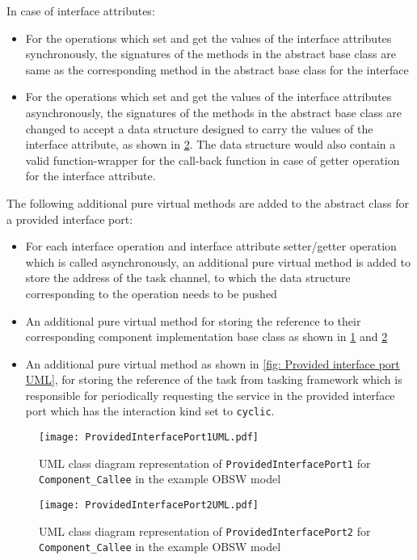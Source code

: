 In case of interface attributes:
\begin{itemize}
\item For the operations which set and get the values of the interface attributes synchronously, the signatures of the methods in the abstract base class are same as the corresponding method in the abstract base class for the interface
\item For the operations which set and get the values of the interface attributes asynchronously, the signatures of the methods in the abstract base class are changed to accept a data structure designed to carry the values of the interface attribute, as shown in \cref{fig: Provided interface port2 UML}. The data structure would also contain a valid function-wrapper for the call-back function in case of getter operation for the interface attribute.  
\end{itemize}

The following additional pure virtual methods are added to the abstract class for a provided interface port:
\begin{itemize}
\item For each interface operation and interface attribute setter/getter operation which is called asynchronously, an additional pure virtual method is added to store the address of the task channel, to which the data structure corresponding to the operation needs to be pushed
\item An additional pure virtual method for storing the reference to their corresponding component implementation base class as shown in \cref{fig: Provided interface port1 UML} and \cref{fig: Provided interface port2 UML}
\item An additional pure virtual method as shown in \cref{fig: Provided interface port UML}, for storing the reference of the task from tasking framework which is responsible for periodically requesting the service in the provided interface port which has the interaction kind set to \texttt{cyclic}. 
\end{itemize}

\begin{figure}[h]
	\centering
	\texttt{[image: ProvidedInterfacePort1UML.pdf]}
	\caption{UML class diagram representation of \texttt{Provided\allowbreak Interface\allowbreak Port1} for \texttt{Component\allowbreak\_Callee} in the example OBSW model}
	\label{fig: Provided interface port1 UML}
\end{figure}

\begin{figure}[h]
	\centering
	\texttt{[image: ProvidedInterfacePort2UML.pdf]}
	\caption{UML class diagram representation of \texttt{Provided\allowbreak Interface\allowbreak Port2} for \texttt{Component\allowbreak\_Callee} in the example OBSW model}
	\label{fig: Provided interface port2 UML}
\end{figure}

